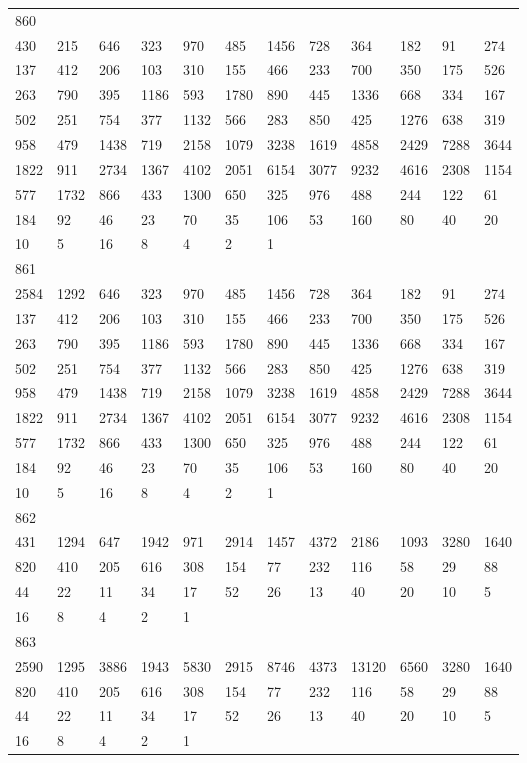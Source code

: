 \begin{longtable}{llllllllllll}
860&&&&&&&&&&&\\
430& 215& 646& 323& 970& 485& 1456& 728& 364& 182& 91& 274\\
137& 412& 206& 103& 310& 155& 466& 233& 700& 350& 175& 526\\
263& 790& 395& 1186& 593& 1780& 890& 445& 1336& 668& 334& 167\\
502& 251& 754& 377& 1132& 566& 283& 850& 425& 1276& 638& 319\\
958& 479& 1438& 719& 2158& 1079& 3238& 1619& 4858& 2429& 7288& 3644\\
1822& 911& 2734& 1367& 4102& 2051& 6154& 3077& 9232& 4616& 2308& 1154\\
577& 1732& 866& 433& 1300& 650& 325& 976& 488& 244& 122& 61\\
184& 92& 46& 23& 70& 35& 106& 53& 160& 80& 40& 20\\
10& 5& 16& 8& 4& 2& 1& \\

861&&&&&&&&&&&\\
2584& 1292& 646& 323& 970& 485& 1456& 728& 364& 182& 91& 274\\
137& 412& 206& 103& 310& 155& 466& 233& 700& 350& 175& 526\\
263& 790& 395& 1186& 593& 1780& 890& 445& 1336& 668& 334& 167\\
502& 251& 754& 377& 1132& 566& 283& 850& 425& 1276& 638& 319\\
958& 479& 1438& 719& 2158& 1079& 3238& 1619& 4858& 2429& 7288& 3644\\
1822& 911& 2734& 1367& 4102& 2051& 6154& 3077& 9232& 4616& 2308& 1154\\
577& 1732& 866& 433& 1300& 650& 325& 976& 488& 244& 122& 61\\
184& 92& 46& 23& 70& 35& 106& 53& 160& 80& 40& 20\\
10& 5& 16& 8& 4& 2& 1& \\

862&&&&&&&&&&&\\
431& 1294& 647& 1942& 971& 2914& 1457& 4372& 2186& 1093& 3280& 1640\\
820& 410& 205& 616& 308& 154& 77& 232& 116& 58& 29& 88\\
44& 22& 11& 34& 17& 52& 26& 13& 40& 20& 10& 5\\
16& 8& 4& 2& 1& \\

863&&&&&&&&&&&\\
2590& 1295& 3886& 1943& 5830& 2915& 8746& 4373& 13120& 6560& 3280& 1640\\
820& 410& 205& 616& 308& 154& 77& 232& 116& 58& 29& 88\\
44& 22& 11& 34& 17& 52& 26& 13& 40& 20& 10& 5\\
16& 8& 4& 2& 1& \\


\end{longtable}
